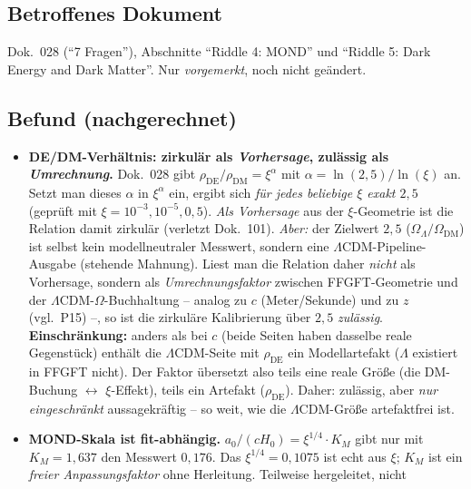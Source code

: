 \subsection*{Betroffenes Dokument}

Dok.~028 (\enquote{7 Fragen}), Abschnitte \enquote{Riddle 4: MOND} und
\enquote{Riddle 5: Dark Energy and Dark Matter}. Nur \emph{vorgemerkt}, noch
nicht geändert.

\subsection*{Befund (nachgerechnet)}

\begin{itemize}
  \item \textbf{DE/DM-Verhältnis: zirkulär als \emph{Vorhersage}, zulässig als
        \emph{Umrechnung}.} Dok.~028 gibt $\rho_{\text{DE}}/\rho_{\text{DM}} =
        \xi^{\alpha}$ mit $\alpha = \ln(2{,}5)/\ln(\xi)$ an. Setzt man dieses
        $\alpha$ in $\xi^{\alpha}$ ein, ergibt sich \emph{für jedes beliebige
        $\xi$ exakt $2{,}5$} (geprüft mit $\xi = 10^{-3}, 10^{-5}, 0{,}5$).
        \emph{Als Vorhersage} aus der $\xi$-Geometrie ist die Relation damit
        zirkulär (verletzt Dok.~101). \emph{Aber:} der Zielwert $2{,}5$
        ($\Omega_\Lambda/\Omega_{\text{DM}}$) ist selbst kein modellneutraler
        Messwert, sondern eine $\Lambda$CDM-Pipeline-Ausgabe (stehende Mahnung).
        Liest man die Relation daher \emph{nicht} als Vorhersage, sondern als
        \emph{Umrechnungsfaktor} zwischen FFGFT-Geometrie und der
        $\Lambda$CDM-$\Omega$-Buchhaltung -- analog zu $c$ (Meter/Sekunde) und
        zu $z$ (vgl.\ P15) --, so ist die zirkuläre Kalibrierung über $2{,}5$
        \emph{zulässig}. \textbf{Einschränkung:} anders als bei $c$ (beide Seiten
        haben dasselbe reale Gegenstück) enthält die $\Lambda$CDM-Seite mit
        $\rho_{\text{DE}}$ ein Modellartefakt ($\Lambda$ existiert in FFGFT
        nicht). Der Faktor übersetzt also teils eine reale Größe (die
        DM-Buchung $\leftrightarrow$ $\xi$-Effekt), teils ein Artefakt
        ($\rho_{\text{DE}}$). Daher: zulässig, aber \emph{nur eingeschränkt}
        aussagekräftig -- so weit, wie die $\Lambda$CDM-Größe artefaktfrei ist.
  \item \textbf{MOND-Skala ist fit-abhängig.} $a_0/(cH_0) = \xi^{1/4}\cdot K_M$
        gibt nur mit $K_M = 1{,}637$ den Messwert $0{,}176$. Das $\xi^{1/4} =
        0{,}1075$ ist echt aus $\xi$; $K_M$ ist ein \emph{freier
        Anpassungsfaktor} ohne Herleitung. Teilweise hergeleitet, nicht

\end{itemize}
